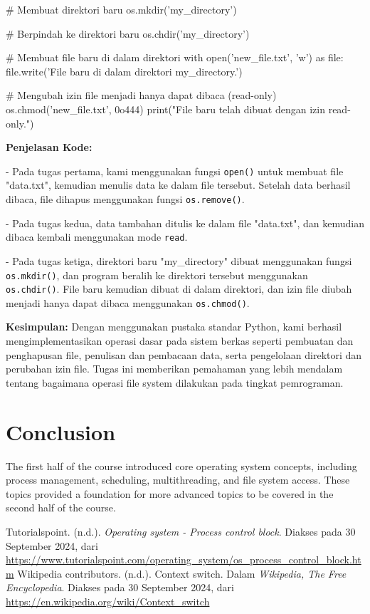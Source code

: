 \documentclass[12pt]{article}
\begin{document}
\begin{python}
# Membuat direktori baru
os.mkdir('my_directory')

# Berpindah ke direktori baru
os.chdir('my_directory')

# Membuat file baru di dalam direktori
with open('new_file.txt', 'w') as file:
    file.write('File baru di dalam direktori my_directory.')

# Mengubah izin file menjadi hanya dapat dibaca (read-only)
os.chmod('new_file.txt', 0o444)
print("File baru telah dibuat dengan izin read-only.")
\end{python}

\textbf{Penjelasan Kode:}

- Pada tugas pertama, kami menggunakan fungsi \texttt{open()} untuk membuat file "data.txt", kemudian menulis data ke dalam file tersebut. Setelah data berhasil dibaca, file dihapus menggunakan fungsi \texttt{os.remove()}.

- Pada tugas kedua, data tambahan ditulis ke dalam file "data.txt", dan kemudian dibaca kembali menggunakan mode \texttt{read}.

- Pada tugas ketiga, direktori baru "my\_directory" dibuat menggunakan fungsi \texttt{os.mkdir()}, dan program beralih ke direktori tersebut menggunakan \texttt{os.chdir()}. File baru kemudian dibuat di dalam direktori, dan izin file diubah menjadi hanya dapat dibaca menggunakan \texttt{os.chmod()}.

\textbf{Kesimpulan:}
Dengan menggunakan pustaka standar Python, kami berhasil mengimplementasikan operasi dasar pada sistem berkas seperti pembuatan dan penghapusan file, penulisan dan pembacaan data, serta pengelolaan direktori dan perubahan izin file. Tugas ini memberikan pemahaman yang lebih mendalam tentang bagaimana operasi file system dilakukan pada tingkat pemrograman.

\section{Conclusion}
The first half of the course introduced core operating system concepts, including process management, scheduling, multithreading, and file system access. These topics provided a foundation for more advanced topics to be covered in the second half of the course.

\begin{thebibliography}{}
    \bibitem{}
    Tutorialspoint. (n.d.). \textit{Operating system - Process control block}. Diakses pada 30 September 2024, dari \url{https://www.tutorialspoint.com/operating_system/os_process_control_block.htm}
    \bibitem{}
    Wikipedia contributors. (n.d.). Context switch. Dalam \textit{Wikipedia, The Free Encyclopedia}. Diakses pada 30 September 2024, dari \url{https://en.wikipedia.org/wiki/Context_switch} 
\end{thebibliography}
\end{document}
